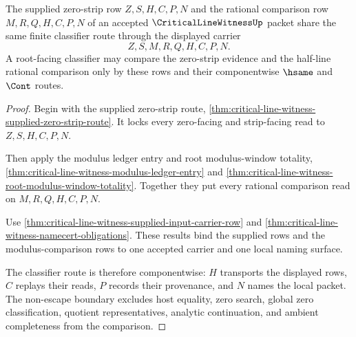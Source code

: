 \begin{theorem}
\label{thm:critical-line-witness-root-strip-comparison-classifier}
The supplied zero-strip row $Z,S,H,C,P,N$ and the rational comparison row
$M,R,Q,H,C,P,N$ of an accepted $\CriticalLineWitnessUp$ packet share the same
finite classifier route through the displayed carrier
$$
Z,S,M,R,Q,H,C,P,N.
$$
A root-facing classifier may compare the zero-strip evidence and the
half-line rational comparison only by these rows and their componentwise
$\hsame$ and $\Cont$ routes.
\end{theorem}
\begin{proof}
Begin with the supplied zero-strip route,
\autoref{thm:critical-line-witness-supplied-zero-strip-route}. It locks every
zero-facing and strip-facing read to $Z,S,H,C,P,N$.

Then apply the modulus ledger entry and root modulus-window totality,
\autoref{thm:critical-line-witness-modulus-ledger-entry} and
\autoref{thm:critical-line-witness-root-modulus-window-totality}. Together
they put every rational comparison read on $M,R,Q,H,C,P,N$.

Use \autoref{thm:critical-line-witness-supplied-input-carrier-row} and
\autoref{thm:critical-line-witness-namecert-obligations}. These results bind
the supplied rows and the modulus-comparison rows to one accepted carrier and
one local naming surface.

The classifier route is therefore componentwise: $H$ transports the displayed
rows, $C$ replays their reads, $P$ records their provenance, and $N$ names the
local packet. The non-escape boundary excludes host equality, zero search,
global zero classification, quotient representatives, analytic continuation,
and ambient completeness from the comparison.
\end{proof}

